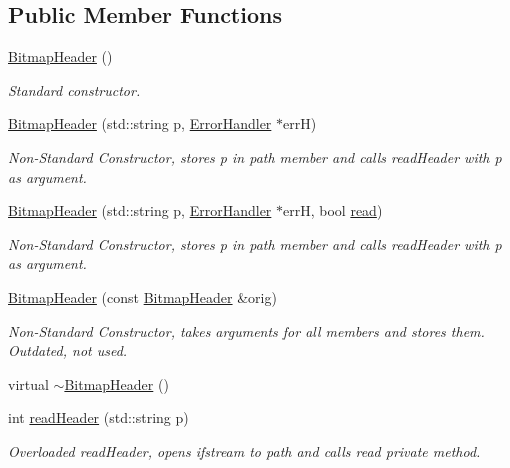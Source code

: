 \subsection*{Public Member Functions}
\begin{DoxyCompactItemize}
\item 
\mbox{\hyperlink{classBitmapHeader_a216e4a8485db7865be70c996f37e4c7d}{Bitmap\+Header}} ()
\begin{DoxyCompactList}\small\item\em Standard constructor. \end{DoxyCompactList}\item 
\mbox{\hyperlink{classBitmapHeader_a2cf57f049eae7d2ee93d5749d678aca5}{Bitmap\+Header}} (std\+::string p, \mbox{\hyperlink{classErrorHandler}{Error\+Handler}} $\ast$errH)
\begin{DoxyCompactList}\small\item\em Non-\/\+Standard Constructor, stores p in path member and calls read\+Header with p as argument. \end{DoxyCompactList}\item 
\mbox{\hyperlink{classBitmapHeader_aa0bf5c2238f213b36d7b85d4b7f90be1}{Bitmap\+Header}} (std\+::string p, \mbox{\hyperlink{classErrorHandler}{Error\+Handler}} $\ast$errH, bool \mbox{\hyperlink{classBitmapHeader_aebc19bf8a908f1f7edfc5b10186c9db8}{read}})
\begin{DoxyCompactList}\small\item\em Non-\/\+Standard Constructor, stores p in path member and calls read\+Header with p as argument. \end{DoxyCompactList}\item 
\mbox{\hyperlink{classBitmapHeader_a25a5481f49d70a8c42a9efc17f17fd48}{Bitmap\+Header}} (const \mbox{\hyperlink{classBitmapHeader}{Bitmap\+Header}} \&orig)
\begin{DoxyCompactList}\small\item\em Non-\/\+Standard Constructor, takes arguments for all members and stores them. Outdated, not used. \end{DoxyCompactList}\item 
virtual \mbox{\hyperlink{classBitmapHeader_a4e102d5fe9a8619fca7319b148ec23d1}{$\sim$\+Bitmap\+Header}} ()
\item 
int \mbox{\hyperlink{classBitmapHeader_a2de360d5111136167f5885bed561bc8c}{read\+Header}} (std\+::string p)
\begin{DoxyCompactList}\small\item\em Overloaded read\+Header, opens ifstream to path and calls read private method. \end{DoxyCompactList}\item 

\end{DoxyCompactItemize}
